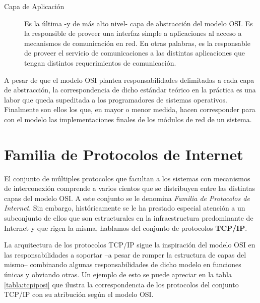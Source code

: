 \begin{intro}
\begin{description}
\item[Capa de Aplicación] Es la última -y de más alto nivel- capa de abstracción del modelo OSI. Es la responsible de proveer una interfaz simple a aplicaciones al acceso a mecanismos de comunicación en red. En otras palabras, es la responsable de proveer el servicio de comunicaciones a las distintas aplicaciones que tengan distintos requerimientos de comunicación.

\end{description}

A pesar de que el modelo OSI plantea responsabilidades delimitadas a cada capa de abstracción, la correspondencia de dicho estándar teórico en la práctica es una labor que queda supeditada a los programadores de sistemas operativos. Finalmente son ellos los que, en mayor o menor medida, hacen corresponder para con el modelo las implementaciones finales de los módulos de red de un sistema.


\section*{Familia de Protocolos de Internet}
El conjunto de múltiples protocolos que facultan a los sistemas con mecanismos de interconexión comprende a varios cientos que se distribuyen entre las distintas capas del modelo OSI. A este conjunto se le denomina \emph{Familia de Protocolos de Internet}. Sin embargo, históricamente se le ha prestado especial atención a un subconjunto de ellos que son estructurales en la infraestructura predominante de Internet y que rigen la misma, hablamos del conjunto de protocolos \textbf{TCP/IP}.

La arquitectura de los protocolos TCP/IP sigue la inspiración del modelo OSI en las responsabilidades a soportar --a pesar de romper la estructura de capas del mismo-- combinando algunas responsabilidades de dicho modelo en funciones únicas y obviando otras. Un ejemplo de esto se puede apreciar en la tabla \ref{tabla:tcpiposi} que ilustra la correspondencia de los protocolos del conjunto TCP/IP con su atribución según el modelo OSI.


\end{intro}
